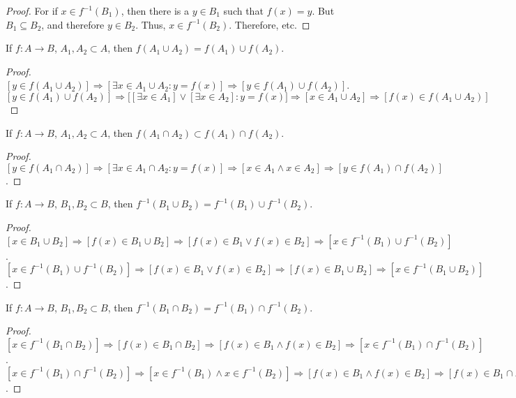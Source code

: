 \documentclass[crop=false,class=book,oneside]{standalone}
\begin{document}
        \begin{proof}
            For if $x\in{f}^{-1}(B_{1})$, then there is a
            $y\in{B}_{1}$ such that $f(x)=y$. But
            $B_{1}\subseteq{B}_{2}$, and therefore $y\in{B}_{2}$.
            Thus, $x\in{f}^{-1}(B_{2})$. Therefore, etc.
        \end{proof}
        \begin{theorem}
        If $f:A\rightarrow B$, $A_1,A_2\subset A$, then $f(A_1 \cup A_2) = f(A_1)\cup f(A_2)$.
        \end{theorem}
        \begin{proof}
        $[y\in f(A_1\cup A_2)]\Rightarrow [\exists x\in A_1 \cup A_2:y=f(x)]\Rightarrow [y \in f(A_1)\cup f(A_2)]$. $[y\in f(A_1)\cup f(A_2)]\Rightarrow \big[[\exists x\in A_1] \lor [\exists x\in A_2]: y=f(x)\big]\Rightarrow [x\in A_1\cup A_2]\Rightarrow [f(x)\in f(A_1\cup A_2)]$
        \end{proof}
        \begin{theorem}
        If $f:A\rightarrow B$, $A_1,A_2\subset A$, then $f(A_1\cap A_2)\subset f(A_1)\cap f(A_2)$.
        \end{theorem}
        \begin{proof}
        $[y\in f(A_1 \cap A_2)]\Rightarrow [\exists x\in A_1 \cap A_2:y=f(x)]\Rightarrow [x\in A_1 \land x \in A_2] \Rightarrow[y \in f(A_1)\cap f(A_2)]$.
        \end{proof}
        \begin{theorem}
        If $f:A\rightarrow B$, $B_1,B_2\subset B$, then $f^{-1}(B_1\cup B_2) = f^{-1}(B_1)\cup f^{-1}(B_2)$.
        \end{theorem}
        \begin{proof}
        $[x\in B_1\cup B_2]\Rightarrow [f(x)\in B_1\cup B_2]\Rightarrow [f(x)\in B_1\lor f(x)\in B_2]\Rightarrow [x\in f^{-1}(B_1)\cup f^{-1}(B_2)]$. $[x \in f^{-1}(B_1)\cup f^{-1}(B_2)]\Rightarrow [f(x)\in B_1\lor f(x) \in B_2]\Rightarrow [f(x) \in B_1\cup B_2]\Rightarrow [x\in f^{-1}(B_1\cup B_2)]$.
        \end{proof}
        \begin{theorem}
        If $f:A\rightarrow B$, $B_1,B_2\subset B$, then $f^{-1}(B_1\cap B_2) = f^{-1}(B_1)\cap f^{-1}(B_2)$.
        \end{theorem}
        \begin{proof}
        $[x\in f^{-1}(B_1\cap B_2)]\Rightarrow [f(x) \in B_1 \cap B_2]\Rightarrow [f(x)\in B_1\land f(x) \in B_2 ]\Rightarrow [x\in f^{-1}(B_1)\cap f^{-1}(B_2)]$. $[x\in f^{-1}(B_1)\cap f^{-1}(B_2)]\Rightarrow [x\in f^{-1}(B_1)\land x\in f^{-1}(B_2)]\Rightarrow [f(x) \in B_1\land f(x) \in B_2]\Rightarrow [f(x)\in B_1\cap B_2]\Rightarrow [x\in f^{-1}(B_1\cap B_2)]$.
        \end{proof}
\end{document}

